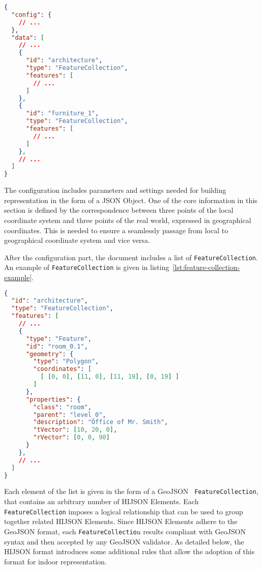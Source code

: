 
\begin{lstlisting}[language=json, label={lst:hijson-example}, captionpos=b, caption=Example of HIJSON document.]
{
  "config": {
    // ...
  },
  "data": [
    // ...
    {
      "id": "architecture",
      "type": "FeatureCollection",
      "features": [
        // ...
      ] 
    },
    {
      "id": "furniture_1",
      "type": "FeatureCollection",
      "features": [
        // ...
      ] 
    },
    // ...
  ]
}
\end{lstlisting}


The configuration includes parameters and settings needed for building representation in the form of a JSON Object. One of the core information in this section is defined by the correspondence between three points of the local coordinate system and three points of the real world, expressed in geographical coordinates. This is needed to ensure a seamlessly passage from local to geographical coordinate system and vice versa.

After the configuration part, the document includes a list of \texttt{FeatureCollection}. An example
of \texttt{FeatureCollection} is given in listing~\ref{lst:feature-collection-example}.


\begin{lstlisting}[language=json, label={lst:feature-collection-example}, captionpos=b,  caption=Example of \texttt{FeatureCollection}.]
{
  "id": "architecture",
  "type": "FeatureCollection",
  "features": [
    // ...
    {
      "type": "Feature",
      "id": "room_0.1",
      "geometry": {
        "type": "Polygon",
        "coordinates": [
          [ [0, 0], [11, 0], [11, 19], [0, 19] ]
        ]
      },
      "properties": {
        "class": "room",
        "parent": "level_0",
        "description": "Office of Mr. Smith",
        "tVector": [10, 20, 0],
        "rVector": [0, 0, 90]
      }
    },
    // ...
  ]
}
\end{lstlisting}

Each element of the list is given in the form of a GeoJSON {\tt
FeatureCollection}, that contains an arbitrary  number of HIJSON Elements.
Each \texttt{FeatureCollection} imposes a logical relationship that can be used
to group together related HIJSON Elements. Since  HIJSON Elements adhere to
the GeoJSON format, each \texttt{FeatureCollectio}n results compliant with GeoJSON
syntax and then accepted by any GeoJSON validator. As detailed below, the
HIJSON format  introduces some additional rules that allow the adoption of
this format for indoor representation.


